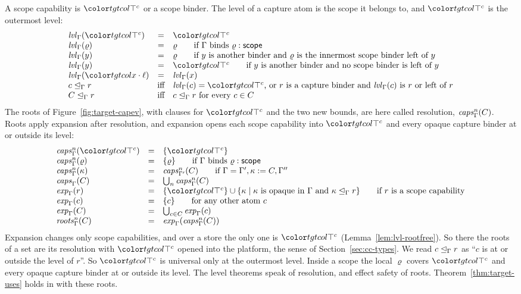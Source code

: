 A scope capability is $\topc$ or a scope binder. The level of a capture atom is the scope it belongs to, and $\topc$ is the outermost level:
\[
\begin{array}{@{}lcl@{}}
\lvl{\Gamma}{\topc} & = & \topc \\
\lvl{\Gamma}{\varrho} & = & \varrho \qquad \text{if } \Gamma \text{ binds } \varrho : \scopeb \\
\lvl{\Gamma}{y} & = & \varrho \qquad \text{if } y \text{ is another binder and } \varrho \text{ is the innermost scope binder left of } y \\
\lvl{\Gamma}{y} & = & \topc \qquad \text{if } y \text{ is another binder and no scope binder is left of } y \\
\lvl{\Gamma}{\sel{x}{\ell}} & = & \lvl{\Gamma}{x} \\
\lvlle{\Gamma}{c}{r} & \text{iff} & \lvl{\Gamma}{c} = \topc\text{, or } r \text{ is a capture binder and } \lvl{\Gamma}{c} \text{ is } r \text{ or left of } r \\
\lvlle{\Gamma}{C}{r} & \text{iff} & \lvlle{\Gamma}{c}{r} \text{ for every } c \in C
\end{array}
\]
The roots of Figure~\ref{fig:target-capev}, with clauses for $\topc$ and the two new bounds, are here called resolution, $\mathit{caps}^{n}_{\Gamma}(C)$. Roots apply expansion after resolution, and expansion opens each scope capability into $\topc$ and every opaque capture binder at or outside its level:
\[
\begin{array}{@{}lcl@{}}
\capsr{\Gamma}{n}{\topc} & = & \cset{\topc} \\
\capsr{\Gamma}{n}{\varrho} & = & \cset{\varrho} \qquad \text{if } \Gamma \text{ binds } \varrho : \scopeb \\
\capsr{\Gamma}{n}{\kappa} & = & \capsr{\Gamma'}{n}{C} \qquad \text{if } \Gamma = \Gamma', \kappa \instb{C}, \Gamma'' \\
\capsr{\Gamma}{}{C} & = & \textstyle\bigcup_{n} \capsr{\Gamma}{n}{C} \\
\expand{\Gamma}{r} & = & \cset{\topc} \cup \{\kappa \mid \kappa \text{ is opaque in } \Gamma \text{ and } \lvlle{\Gamma}{\kappa}{r}\} \qquad \text{if } r \text{ is a scope capability} \\
\expand{\Gamma}{c} & = & \cset{c} \qquad \text{for any other atom } c \\
\expand{\Gamma}{C} & = & \textstyle\bigcup_{c \in C} \expand{\Gamma}{c} \\
\rootsn{\Gamma}{n}{C} & = & \expand{\Gamma}{\capsr{\Gamma}{n}{C}}
\end{array}
\]
Expansion changes only scope capabilities, and over a store the only one is $\topc$ (Lemma~\ref{lem:lvl-rootfree}). So there the roots of a set are its resolution with $\topc$ opened into the platform, the sense of Section~\ref{sec:cc-types}. We read $c \trianglelefteq_{\Gamma} r$ as ``$c$ is at or outside the level of $r$''. So $\topc$ is universal only at the outermost level. Inside a scope the local $\varrho$ covers $\topc$ and every opaque capture binder at or outside its level. The level theorems speak of resolution, and effect safety of roots. Theorem~\ref{thm:target-uses} holds in \treeCC with these roots.

